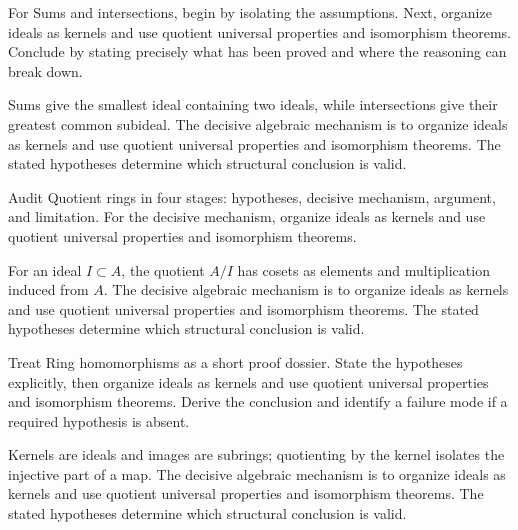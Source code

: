\begin{problem}\label{prob:v01-problem-04}
For Sums and intersections, begin by isolating the assumptions. Next, organize ideals as kernels and use quotient universal properties and isomorphism theorems. Conclude by stating precisely what has been proved and where the reasoning can break down.
\end{problem}
\begin{solution}
Sums give the smallest ideal containing two ideals, while intersections give their greatest common subideal. The decisive algebraic mechanism is to organize ideals as kernels and use quotient universal properties and isomorphism theorems. The stated hypotheses determine which structural conclusion is valid.
\end{solution}

\begin{problem}\label{prob:v01-problem-05}
Audit Quotient rings in four stages: hypotheses, decisive mechanism, argument, and limitation. For the decisive mechanism, organize ideals as kernels and use quotient universal properties and isomorphism theorems.
\end{problem}
\begin{solution}
For an ideal $I\subset A$, the quotient $A/I$ has cosets as elements and multiplication induced from $A$. The decisive algebraic mechanism is to organize ideals as kernels and use quotient universal properties and isomorphism theorems. The stated hypotheses determine which structural conclusion is valid.
\end{solution}

\begin{problem}\label{prob:v01-problem-06}
Treat Ring homomorphisms as a short proof dossier. State the hypotheses explicitly, then organize ideals as kernels and use quotient universal properties and isomorphism theorems. Derive the conclusion and identify a failure mode if a required hypothesis is absent.
\end{problem}
\begin{solution}
Kernels are ideals and images are subrings; quotienting by the kernel isolates the injective part of a map. The decisive algebraic mechanism is to organize ideals as kernels and use quotient universal properties and isomorphism theorems. The stated hypotheses determine which structural conclusion is valid.
\end{solution}

